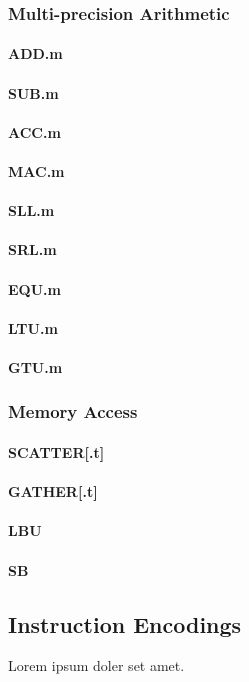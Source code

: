 \subsubsection{Multi-precision Arithmetic}
\paragraph{ADD.m}
\paragraph{SUB.m}
\paragraph{ACC.m}
\paragraph{MAC.m}
\paragraph{SLL.m}
\paragraph{SRL.m}
\paragraph{EQU.m}
\paragraph{LTU.m}
\paragraph{GTU.m}

\subsubsection{Memory Access}
\paragraph{SCATTER[.t]}
\paragraph{GATHER[.t]}
\paragraph{LBU}
\paragraph{SB}


\subsection{Instruction Encodings}

Lorem ipsum doler set amet.


